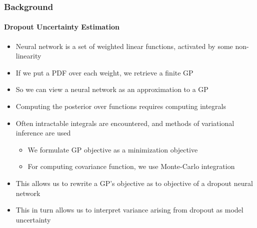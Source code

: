 \documentclass[9pt]{beamer}
\begin{document}
\begin{frame}
\frametitle{Background}
\framesubtitle{Dropout Uncertainty Estimation}
	\begin{itemize}
	\item Neural network is a set of weighted linear functions, activated by some non-linearity
	\item If we put a PDF over each weight, we retrieve a finite GP
	\item So we can view a neural network as an approximation to a GP
	\item Computing the posterior over functions requires computing integrals
	\item Often intractable integrals are encountered, and methods of variational inference are used
	\begin{itemize}
		\item We formulate GP objective as a minimization objective
		\item For computing covariance function, we use Monte-Carlo integration
	\end{itemize}
	\item This allows us to rewrite a GP's objective as to objective of a dropout neural network
	\item This in turn allows us to interpret variance arising from dropout as model uncertainty
\end{itemize}
\end{frame}
\end{document}
